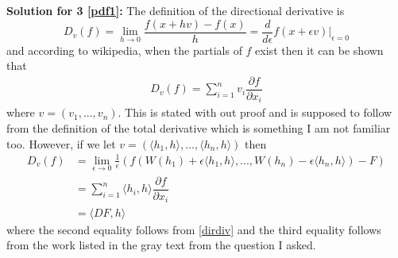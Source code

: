 \documentclass[a4paper,11pt]{article}
\numberwithin{equation}{section}
\theoremstyle{plain}
\theoremstyle{definition}
\numberwithin{NQ}{section}
\numberwithin{LQ}{section}
\numberwithin{ZQ}{section}
\begin{document}
\textbf{Solution for 3 \eqref{pdf1}:} The definition of the directional derivative is 
\[
	D_v(f)=\lim_{h \to 0} \dfrac{f(x+hv)-f(x)}{h}  = \dfrac{d}{d\epsilon} f(x+\epsilon v) |_{\epsilon=0}
\]  
and according to wikipedia, when the partials of $f$ exist then it can be shown that 
\begin{align}
	D_v(f) = \sum_{i=1}^nv_i\dfrac{\partial f}{\partial x_i} \label{dirdiv}
\end{align}
where $v=(v_1,...,v_n)$. This is stated with out proof and is supposed to follow from the definition of the total derivative which is something I am not familiar too. However, if we let $v = (\langle h_1 ,h \rangle, ..., \langle h_n,h \rangle)$ then 
\begin{align*}
		D_v(f) &=  \lim_{\epsilon \to 0}\frac{1}{\epsilon}(f(W(h_1)+\epsilon\langle h_1,h \rangle,...,W(h_n)-\epsilon \langle h_n,h \rangle)-F)
	\\& = \sum_{i=1}^n \langle h_i,h \rangle \dfrac{\partial f}{\partial x_i}
	\\ & = \langle DF,h \rangle 
	\end{align*}
	where the second equality follows from \eqref{dirdiv} and the third equality follows from the work listed in the gray text from the question I asked. 
\end{document}
